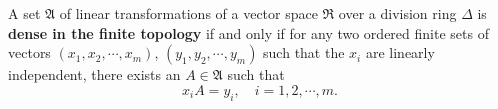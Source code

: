 A set $\mathfrak{A}$ of linear transformations of a vector space $\mathfrak{R}$ over a division ring $\Delta$ is \textbf{dense in the finite topology} if and only if for any two ordered finite sets of vectors $(x_1, x_2, \cdots, x_m)$, $(y_1, y_2, \cdots, y_m)$ such that the $x_i$ are linearly independent, there exists an $A \in \mathfrak{A}$ such that
$$x_i A = y_i, \quad i = 1, 2, \cdots, m.$$
